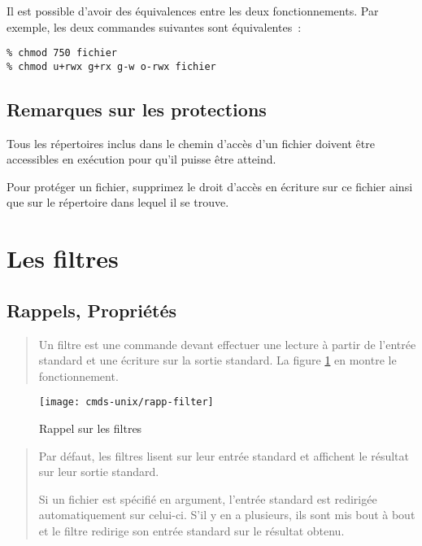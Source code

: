 \begin{remarque}
Il est possible d'avoir des {\'e}quivalences entre les deux fonctionnements. Par
exemple, les deux commandes suivantes sont {\'e}quivalentes~:

\begin{verbatim}
% chmod 750 fichier
% chmod u+rwx g+rx g-w o-rwx fichier
\end{verbatim}
\end{remarque}

\subsection{Remarques sur les protections}

Tous les r{\'e}pertoires inclus dans le chemin d'acc{\`e}s d'un fichier doivent
{\^e}tre accessibles en ex{\'e}cution pour qu'il  puisse {\^e}tre atteind.

Pour prot{\'e}ger un fichier, supprimez le droit d'acc{\`e}s en {\'e}criture sur ce
fichier ainsi que sur le r{\'e}pertoire dans lequel il se trouve.

\section{Les filtres}

\subsection{Rappels, Propri{\'e}t{\'e}s}

\begin{quote}
Un filtre est une commande devant effectuer une lecture {\`a} partir de
l'entr{\'e}e standard et une {\'e}criture sur la sortie standard. La figure
\ref{fig-cmds-rapp-filter} en montre le fonctionnement.
\end{quote}

\begin{figure}[hbtp]
\centering
\texttt{[image: cmds-unix/rapp-filter]}
\caption{\label{fig-cmds-rapp-filter}Rappel sur les filtres}
\end{figure}

\begin{quote}
Par d{\'e}faut, les filtres lisent sur leur entr{\'e}e standard et affichent le
r{\'e}sultat sur leur sortie standard.

Si un fichier est sp{\'e}cifi{\'e} en argument, l'entr{\'e}e standard est redirig{\'e}e
automatiquement sur celui-ci. S'il y en a plusieurs, ils sont mis bout {\`a}
bout et le filtre redirige son entr{\'e}e standard sur le r{\'e}sultat obtenu.
\end{quote}

